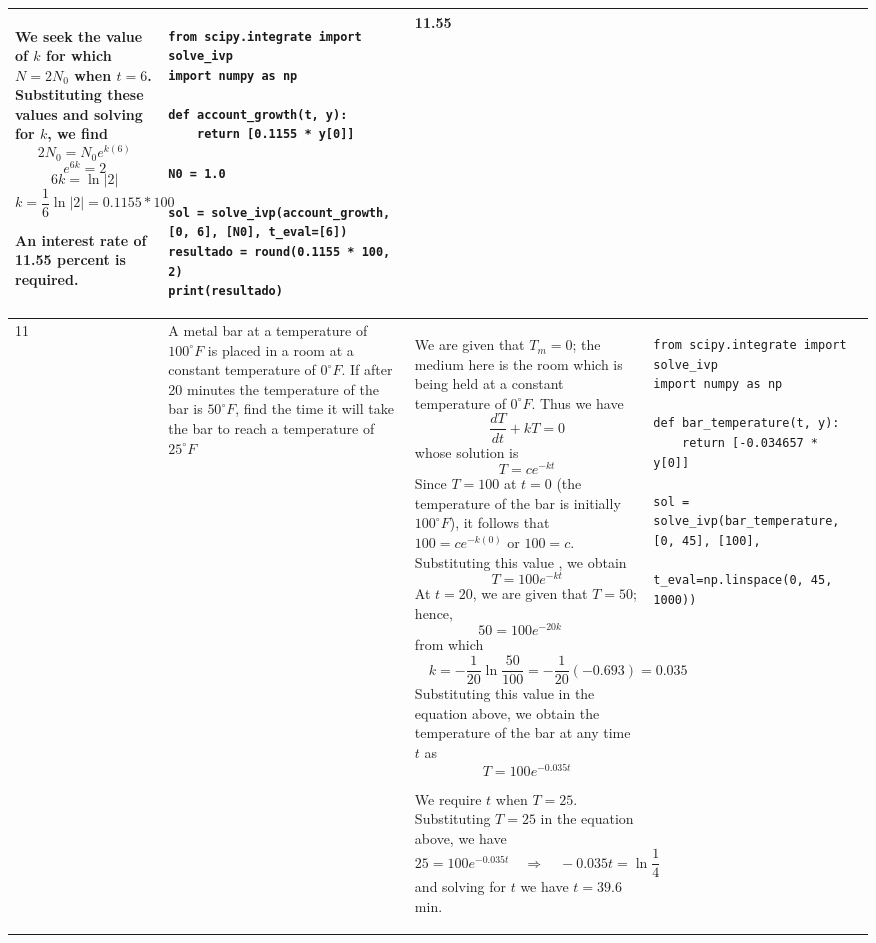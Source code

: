 \documentclass[a4paper,12pt]{article}
\begin{document}
\begin{longtable}{|p{0.3cm}|p{}|p{10cm}|p{}|p{1.5cm}|}
We seek the value of \( k \) for which \( N = 2N_0 \) when \( t = 6 \). Substituting these values  and solving for \( k \), we find
\[
2N_0 = N_0 e^{k(6)}
\]
\[
e^{6k} = 2
\]
\[
6k = \ln |2|
\]
\[
k = \frac{1}{6} \ln |2| = 0.1155*100%
\]

An interest rate of 11.55 percent is required.

  &
\begin{verbatim}
from scipy.integrate import solve_ivp
import numpy as np

def account_growth(t, y):
    return [0.1155 * y[0]]

N0 = 1.0

sol = solve_ivp(account_growth, [0, 6], [N0], t_eval=[6])
resultado = round(0.1155 * 100, 2)
print(resultado)\end{verbatim} &   11.55              \\ \hline
    11             &  
A metal bar at a temperature of \( 100^\circ F\) is placed in a room at a constant temperature of \( 0^\circ F \). If after 20 minutes the temperature of the bar is \( 50^\circ F \), find  the time it will take the bar to reach a temperature of \( 25^\circ F\)        &


We are given that \( T_m = 0 \); the medium here is the room which is being held at a constant temperature of \( 0^\circ F \). Thus we have
\[
\frac{dT}{dt} + kT = 0
\]
whose solution is
\[T = ce^{-kt}\]
Since \( T = 100 \) at \( t = 0 \) (the temperature of the bar is initially \( 100^\circ F \)), it follows  that \( 100 = ce^{-k(0)} \) or \( 100 = c \). Substituting this value , we obtain
\[T = 100e^{-kt}\]
At \( t = 20 \), we are given that \( T = 50 \); hence,
\[50 = 100e^{-20k} \quad \] from which \[\quad k = -\frac{1}{20} \ln \frac{50}{100} = -\frac{1}{20}(-0.693) = 0.035
\]
Substituting this value in the equation above, we obtain the temperature of the bar at any time \( t \) as
\[T = 100e^{-0.035t}\]

 We require \( t \) when \( T = 25 \). Substituting \( T = 25 \) in the equation above, we have
    \[
    25 = 100e^{-0.035t} \quad  \Rightarrow \quad -0.035t = \ln \frac{1}{4}  \]  and  solving for $t$ we have $t = 39.6$  min.
  
    
           &\begin{verbatim}from scipy.integrate import solve_ivp
import numpy as np

def bar_temperature(t, y):
    return [-0.034657 * y[0]]

sol = solve_ivp(bar_temperature, [0, 45], [100],
                t_eval=np.linspace(0, 45, 1000))


\end{verbatim}
\end{longtable}
\end{document}
